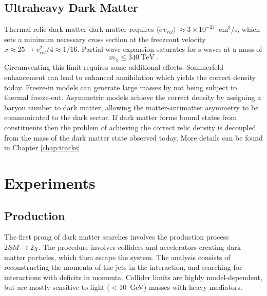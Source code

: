 \subsection{Ultraheavy Dark Matter}
Thermal relic dark matter dark matter requires $\langle\sigma v_{rel}\rangle~\approx 3\times 10^{-27}$~cm$^3$/s, which sets a minimum necessary cross section at the freezeout velocity $x\approx 25 \rightarrow v_{rel}^2/4  \approx 1/16$.
Partial wave expansion saturates for s-waves at a mass of\cite{griest_unitarity_1990}
\begin{equation}
    m_\chi \leq 340 \mathrm{~TeV} \nonumber~.
\end{equation}
\noindent
Circumventing this limit requires some additional effects.
Sommerfeld enhancement can lead to enhanced annihilation which yields the correct density today.
Freeze-in models\cite{kolb_wimpzillas_1998} can generate large masses by not being subject to thermal freeze-out.
Asymmetric models\cite{zurek_asymmetric_2014} achieve the correct density by assigning a baryon number to dark matter, allowing the matter-antimatter asymmetry to be communicated to the dark sector.
If dark matter forms bound states from constituents\cite{gresham_astrophysical_2018} then the problem of achieving the correct relic density is decoupled from the mass of the dark matter state observed today.
More details can be found in Chapter \ref{chap:tracks}.
\afterpage{\FloatBarrier}
\section{Experiments}
\subsection{Production}
The first prong of dark matter searches involves the production process $2 SM \rightarrow 2 \chi$.
The procedure involves colliders and accelerators creating dark matter particles, which then escape the system.
The analysis consists of reconstructing the momenta of the jets in the interaction, and searching for interactions with deficits in momenta.
Collider limits are highly model-dependent, but are mostly sensitive to light ($<$10~GeV) masses with heavy mediators\cite{billard_direct_2022}.


